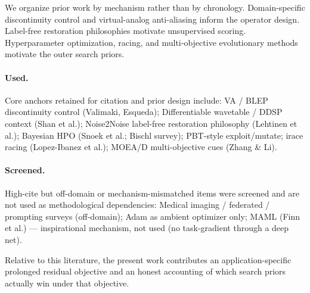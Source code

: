 We organize prior work by mechanism rather than by chronology. Domain-specific discontinuity control and virtual-analog anti-aliasing inform the operator design\cite{valimaki2006va}\cite{esqueda2016aliasing}\cite{esqueda2016blamp}. Label-free restoration philosophies motivate unsupervised scoring\cite{shan2021dwt}\cite{lehtinen2018n2n}. Hyperparameter optimization, racing, and multi-objective evolutionary methods motivate the outer search priors\cite{snoek2012bo}\cite{bischl2023hpo}\cite{lopez2016irace}\cite{zhang2007moead}.

\paragraph{Used.}

Core anchors retained for citation and prior design include: VA / BLEP discontinuity control (Valimaki, Esqueda); Differentiable wavetable / DDSP context (Shan et al.); Noise2Noise label-free restoration philosophy (Lehtinen et al.); Bayesian HPO (Snoek et al.; Bischl survey); PBT-style exploit/mutate; irace racing (Lopez-Ibanez et al.); MOEA/D multi-objective cues (Zhang \& Li).

\paragraph{Screened.}

High-cite but off-domain or mechanism-mismatched items were screened and are not used as methodological dependencies: Medical imaging / federated / prompting surveys (off-domain); Adam as ambient optimizer only; MAML (Finn et al.) --- inspirational mechanism, not used (no task-gradient through a deep net).

Relative to this literature, the present work contributes an application-specific prolonged residual objective and an honest accounting of which search priors actually win under that objective.
